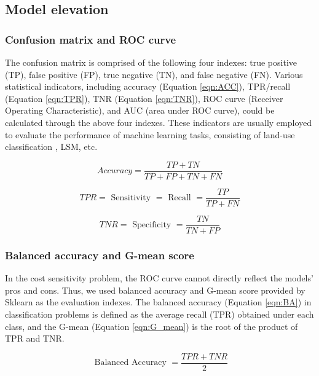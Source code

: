 \documentclass[a4paper,fleqn]{cas-sc}
\begin{document}
\subsection{Model elevation}
\subsubsection{Confusion matrix and ROC curve}

The confusion matrix is comprised of the following four indexes: true positive (TP), false positive (FP), true negative (TN), and false negative (FN). 
Various statistical indicators, including accuracy (Equation \ref{eqn:ACC}), TPR/recall (Equation \ref{eqn:TPR}), TNR (Equation \ref{eqn:TNR}), ROC curve (Receiver Operating Characteristic), and AUC (area under ROC curve), could be calculated through the above four indexes. 
These indicators are usually employed to evaluate the performance of machine learning tasks, consisting of land-use classification \citep{Jr2014IJoGIS}, LSM, etc.

\begin{equation}
  Accuracy=\frac{T P+T N}{T P+F P+T N+F N}
  \label{eqn:ACC}
\end{equation}

\begin{equation}
  T P R=\text { Sensitivity }=\text { Recall }=\frac{T P}{T P+F N}
  \label{eqn:TPR}
\end{equation}

\begin{equation}
  T N R=\text { Specificity }=\frac{T N}{T N+F P}
  \label{eqn:TNR}
\end{equation}

\subsubsection{Balanced accuracy and G-mean score}

In the cost sensitivity problem, the ROC curve cannot directly reflect the models' pros and cons. 
Thus, we used balanced accuracy and G-mean score provided by Sklearn \cite{scikit-learn} as the evaluation indexes. The balanced accuracy (Equation \ref{eqn:BA}) in classification problems is defined as the average recall (TPR) obtained under each class, and the G-mean (Equation \ref{eqn:G_mean}) is the root of the product of TPR and TNR. 

\begin{equation}
  \text { Balanced Accuracy }=\frac{T P R+T N R}{2}
  \label{eqn:BA}
\end{equation}
\end{document}
